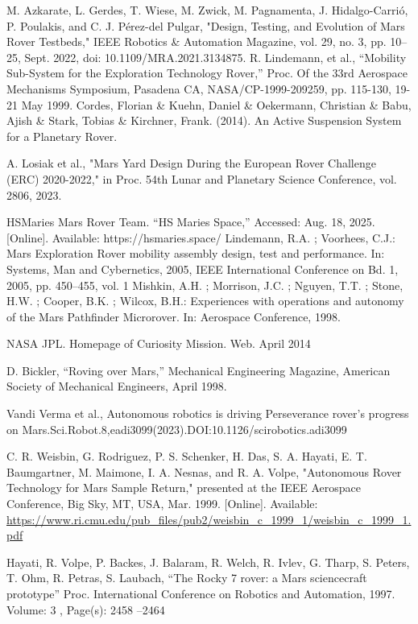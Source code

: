 \documentclass[letterpaper, 10 pt, conference]{ieeeconf}  %
\begin{document}
\begin{thebibliography}{99}
 M. Azkarate, L. Gerdes, T. Wiese, M. Zwick, M. Pagnamenta, J. Hidalgo-Carrió, P. Poulakis, and C. J. Pérez-del Pulgar, "Design, Testing, and Evolution of Mars Rover Testbeds," IEEE Robotics \& Automation Magazine, vol. 29, no. 3, pp. 10–25, Sept. 2022, doi: 10.1109/MRA.2021.3134875.
 R. Lindemann, et al., “Mobility Sub-System for the Exploration Technology Rover,” Proc. Of the 33rd Aerospace Mechanisms Symposium, Pasadena CA,
NASA/CP-1999-209259, pp. 115-130, 19-21 May 1999.
Cordes, Florian \& Kuehn, Daniel \& Oekermann, Christian \& Babu, Ajish \& Stark, Tobias \& Kirchner, Frank. (2014). An Active Suspension System for a Planetary Rover. 

 A. Losiak et al., "Mars Yard Design During the European Rover Challenge (ERC) 2020-2022," in Proc. 54th Lunar and Planetary Science Conference, vol. 2806, 2023.


HSMaries Mars Rover Team. “HS Maries Space,” Accessed: Aug. 18, 2025. [Online]. Available: https://hsmaries.space/
Lindemann, R.A. ; Voorhees, C.J.: Mars Exploration Rover mobility assembly design, test and performance. In: Systems, Man and Cybernetics, 2005, IEEE International Conference on Bd. 1, 2005, pp. 450--455, vol. 1
 Mishkin, A.H. ; Morrison, J.C. ; Nguyen, T.T. ; Stone, H.W. ; Cooper, B.K. ; Wilcox, B.H.: Experiences with operations and autonomy of the Mars Pathfinder Microrover. In: Aerospace Conference, 1998.

 NASA JPL. Homepage of Curiosity Mission. Web. April 2014

 D. Bickler, “Roving over Mars,” Mechanical
Engineering Magazine, American Society of Mechanical
Engineers, April 1998.

 Vandi Verma et al., Autonomous robotics is driving Perseverance rover’s progress on Mars.Sci.Robot.8,eadi3099(2023).DOI:10.1126/scirobotics.adi3099

 C. R. Weisbin, G. Rodriguez, P. S. Schenker, H. Das, S. A. Hayati, E. T. Baumgartner, M. Maimone, I. A. Nesnas, and R. A. Volpe, "Autonomous Rover Technology for Mars Sample Return," presented at the IEEE Aerospace Conference, Big Sky, MT, USA, Mar. 1999. [Online]. Available: \url{https://www.ri.cmu.edu/pub_files/pub2/weisbin_c_1999_1/weisbin_c_1999_1.pdf}


Hayati, R. Volpe, P. Backes, J. Balaram, R. Welch, R. Ivlev, G. Tharp, S. Peters, T. Ohm, R. Petras, S. Laubach, “The Rocky 7 rover: a Mars sciencecraft prototype” Proc. International Conference on Robotics and Automation, 1997. Volume: 3 , Page(s): 2458 –2464


\end{thebibliography}
\end{document}
